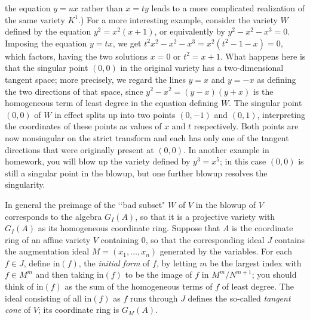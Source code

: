 \documentclass[10pt]{article}
\begin{document}
the equation $y=ux$ rather than $x = ty$ leads to a more complicated
realization of the same variety $K^1$.) For a more interesting example,
consider the variety $W$ defined by the equation $y^2 = x^2(x+1)$, or
equivalently by $y^2 - x^2 - x^3 = 0$. Imposing the equation $y = tx$,
we get $t^2 x^2 - x^2 - x^3 = x^2(t^2 - 1 - x) = 0$, which factors,
having the two solutions $x=0$ or $t^2=x +1$. What happens here is that
the singular point $(0,0)$ in the original variety has a two-dimensional
tangent space; more precisely, we regard the lines $y = x$ and $y = -x$
as defining the two directions of that space, since $y^2 - x^2 =
(y-x)(y+x)$ is the homogeneous term of least degree in the equation
defining $W$. The singular point $(0,0)$ of $W$ in effect splits up into
two points $(0,-1)$ and $(0,1)$, interpreting the coordinates of these
points as values of $x$ and $t$ respectively. Both points are now
nonsingular on the strict transform and each has only one of the tangent
directions that were originally present at $(0,0)$. In another example
in homework, you will blow up the variety defined by $y^3 = x^5$; in
this case $(0,0)$ is still a singular point in the blowup, but one
further blowup resolves the singularity.

In general the preimage of the \lq\lq bad subset" $W$ of $V$ in the
blowup of $V$ corresponds to the algebra $G_I(A)$, so that it is a
projective variety with $G_I(A)$ as its homogeneous coordinate ring.
Suppose that $A$ is the coordinate ring of an affine variety $V$
containing 0, so that the corresponding ideal $J$ contains the
augmentation ideal $M=(x_1,\ldots,x_n)$ generated by the variables. For
each $f\in J$, define in$(f)$, the {\sl initial form} of $f$, by letting
$m$ be the largest index with $f\in M^m$ and then taking in$(f)$ to be
the image of $f$ in $M^m/N^{m+1}$; you should think of in$(f)$ as the
sum of the homogeneous terms of $f$ of least degree. The ideal
consisting of all in$(f)$ as $f$ runs through $J$ defines the so-called
{\sl tangent cone} of $V$; its coordinate ring is $G_M(A)$.
\end{document}
